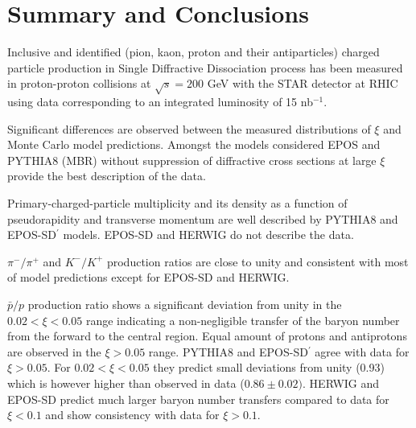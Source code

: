 \chapter{Summary and Conclusions}\label{chapter:summary}

Inclusive and identified (pion, kaon, proton and their antiparticles) charged particle production in Single Diffractive Dissociation process has been measured in proton-proton collisions at $\sqrt{s}= 200$ GeV with the STAR detector at RHIC using data corresponding to an integrated luminosity of 15 nb$^{-1}$.

Significant differences are observed between the measured distributions of $\xi$ and Monte Carlo model predictions. Amongst the models considered EPOS and PYTHIA8 (MBR) without suppression of diffractive cross sections at large $\xi$ provide the best description of the data.

Primary-charged-particle multiplicity and its density as a function of pseudorapidity and transverse momentum are well described by PYTHIA8 and EPOS-SD$^\prime$ models.  EPOS-SD and HERWIG do not describe the data.

$\pi^-/\pi^+$ and $K^-/K^+$ production ratios are close to unity and consistent with most of model predictions except for EPOS-SD and HERWIG.

$\bar{p}/p$ production ratio shows a significant deviation from unity 
in the $0.02<\xi<0.05$ range indicating a non-negligible transfer of the baryon number from the forward to the central region. Equal amount of protons and antiprotons are observed in the $\xi>0.05$ range.
PYTHIA8 and EPOS-SD$^\prime$ agree with data for $\xi>0.05$. 
For $0.02<\xi<0.05$ they predict small deviations from unity (0.93) which is however higher than observed in data ($0.86\pm 0.02)$. 
HERWIG and EPOS-SD predict much larger baryon number transfers compared to data for $\xi<0.1$ and show consistency with data for $\xi>0.1$.